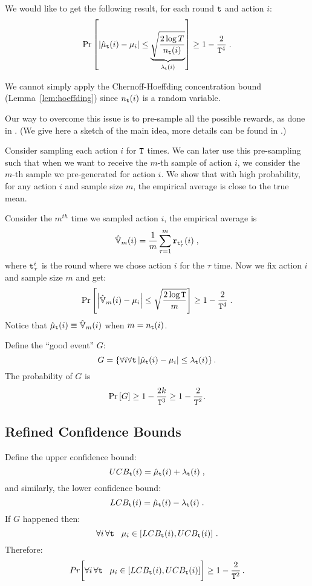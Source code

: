 We would like to get the following result, for each round ${\tt t}$ and action $i$:
\[
\Pr\left[\left|\hat{\mu}_{{\tt t}}(i)-\mu_{i}\right|\le\underbrace{\sqrt{\frac{2\log
T}{n_{{\tt t}}(i)}}}_{\lambda_{{\tt t}}(i)}\right]\ge1-\frac{2}{{\tt T}^{4}}\;.
\]

We cannot simply apply the Chernoff-Hoeffding concentration bound (Lemma~\ref{lem:hoeffding}) since $n_{\tt t}(i)$ is a random variable.

Our way to overcome this issue is to pre-sample all the possible rewards, as done in \cite{Slivkins-book-19}. (We give here a sketch of the main idea, more details can be found in \cite{Slivkins-book-19}.)

Consider sampling each action $i$ for ${\tt T}$ times. We can later use this pre-sampling such that when we want to receive the $m$-th sample of action $i$, we consider the $m$-th sample we pre-generated for action $i$. We show that with high probability, for any action $i$ and sample size $m$, the empirical average is close to the true mean.

Consider the $m^{th}$ time we sampled action $i$, the empirical average is 
\[
\hat{\mathbb{V}}_{m}(i)=\frac{1}{m} \sum_{\tau=1}^{m}{\tt r}_{{\tt t}_{\tau}^i}(i)\;,
\]
where ${\tt t}_{\tau}^i$ is the round where we chose action $i$ for the $\tau$ time.
%
Now we fix action $i$ and sample size $m$ and get:
\[
\Pr\left[\left|\hat{\mathbb{V}}_{m}(i)-\mu_{i}\right|\le\sqrt{\frac{2\log
{\tt T}}{m}}\right]\ge1-\frac{2}{{\tt T}^{4}}\;.
\]
Notice that $\hat{\mu}_{{\tt t}}(i)\equiv\hat{\mathbb{V}}_{m}(i)$ when
$m=n_{{\tt t}}(i)$.

Define the ``good event'' $G$:
\[
G=\left\{ \forall {i}\forall {{\tt t}}\left|\hat{\mu}_{{\tt t}}(i)-\mu_{i}\right|\le\lambda_{{\tt t}}(i)\right\}.
\]
The probability of $G$ is
\[
\Pr\left[G\right]\ge 1-\frac{2k}{{\tt T}^{3}}\ge 1-\frac{2}{{\tt T}^{2}}.
\]



\subsection{Refined Confidence Bounds}

Define the upper confidence bound:
\[
UCB_{{\tt t}}(i)=\hat{\mu}_{{\tt t}}(i)+\lambda_{{\tt t}}(i)\;,
\]
and similarly, the lower confidence bound:
\[
LCB_{{\tt t}}(i)=\hat{\mu}_{{\tt t}}(i)-\lambda_{{\tt t}}(i)\;.
\]
If $G$ happened then:
\[
\forall{i}\,\forall{{\tt t}}\;\;\;\mu_{i}\in\left[LCB_{{\tt t}}(i),UCB_{{\tt t}}(i)\right]\, .
\]
Therefore:
\[
Pr\biggl[\forall{i}\,\forall{{\tt t}}\;\;\;
\mu_{i}\in\left[LCB_{{\tt t}}(i),UCB_{{\tt t}}(i)\right]\biggr]\ge1-\frac{2}{{\tt T}^{2}}\,.
\]

